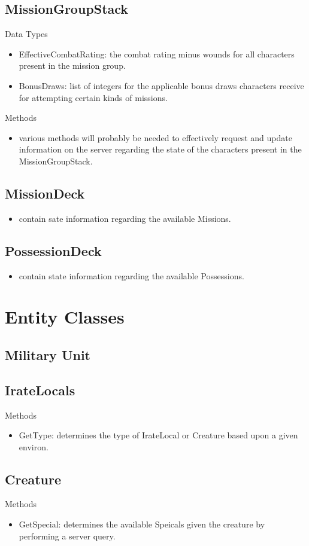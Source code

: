 \documentclass[12pt,letterpaper]{scrreprt}
\begin{document}
	\section{MissionGroupStack}
	Data Types
	\begin{itemize}
		\item EffectiveCombatRating: the combat rating minus wounds for all characters present in the mission group.
		\item BonusDraws: list of integers for the applicable bonus draws characters receive for attempting certain kinds of missions.
	\end{itemize}
	Methods
	\begin{itemize}
 		\item various methods will probably be needed to effectively request and update information on the server regarding the state of the characters present in the MissionGroupStack.
	\end{itemize}
	\section{MissionDeck}
	\begin{itemize}
 		\item contain sate information regarding the available Missions.
	\end{itemize}
	\section{PossessionDeck}
	\begin{itemize}
 		\item contain state information regarding the available Possessions.
	\end{itemize}
\chapter{Entity Classes}
	\section{Military Unit}
	\section{IrateLocals}
	Methods
	\begin{itemize}
		\item GetType: determines the type of IrateLocal or Creature based upon a given environ.
	\end{itemize}
	\section{Creature}
		Methods
		\begin{itemize}
			\item GetSpecial: determines the available Speicals given the creature by performing a server query.
		\end{itemize}
\end{document}
